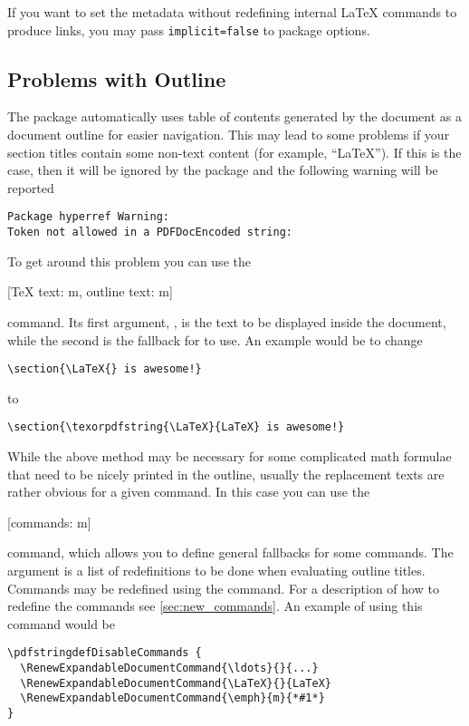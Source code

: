 If you want to set the metadata without redefining internal \LaTeX{} commands
to produce links, you may pass \texttt{implicit=false} to
 package options.
\endgroup

\subsection{Problems with Outline}

The  package automatically uses table of contents generated by
the document as a document outline for easier navigation. This may lead to some
problems if your section titles contain some non-text content (for example,
\enquote{\LaTeX}). If this is the case, then it will be ignored by the
package and the following warning will be reported
\begin{code}
\begin{verbatim}
Package hyperref Warning:
Token not allowed in a PDFDocEncoded string:
\end{verbatim}
\end{code}
To get around this problem you can use the
\begin{lscommand}
  [\bs TeX{} text: m, outline text: m]
\end{lscommand}
command. Its first argument, , is the text to be displayed
inside the document, while the second is the fallback for  to
use. An example would be to change
\begin{verbatim}
\section{\LaTeX{} is awesome!}
\end{verbatim}
to
\begin{verbatim}
\section{\texorpdfstring{\LaTeX}{LaTeX} is awesome!}
\end{verbatim}

While the above method may be necessary for some complicated math formulae
that need to be nicely printed in the outline, usually the replacement texts
are rather obvious for a given command. In this case you can use the
\begin{lscommand}
  [commands: m]
\end{lscommand}
command, which allows you to define general fallbacks for some commands. The
 argument is a list of redefinitions to be done when evaluating
outline titles. Commands may be redefined using the
 command. For a description of how to
redefine the commands see \autoref{sec:new_commands}. An example of using this
command would be
\begin{verbatim}
\pdfstringdefDisableCommands {
  \RenewExpandableDocumentCommand{\ldots}{}{...}
  \RenewExpandableDocumentCommand{\LaTeX}{}{LaTeX}
  \RenewExpandableDocumentCommand{\emph}{m}{*#1*}
}
\end{verbatim}

